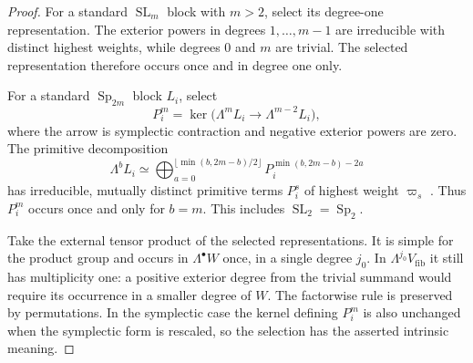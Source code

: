 \begin{proof}
For a standard $\operatorname{SL}_m$ block with $m>2$, select its
degree-one representation.  The exterior powers in degrees
$1,\ldots,m-1$ are irreducible with distinct highest weights, while
degrees $0$ and $m$ are trivial.  The selected representation therefore
occurs once and in degree one only.

For a standard $\operatorname{Sp}_{2m}$ block $L_i$, select
\[
 P_i^m=\ker\bigl(\Lambda^mL_i\longrightarrow\Lambda^{m-2}L_i\bigr),
\]
where the arrow is symplectic contraction and negative exterior powers
are zero.  The primitive decomposition
\[
 \Lambda^bL_i\simeq
 \bigoplus_{a=0}^{\lfloor\min(b,2m-b)/2\rfloor}
 P_i^{\min(b,2m-b)-2a}
\]
has irreducible, mutually distinct primitive terms $P_i^s$ of highest
weight $\varpi_s$ \cite[Theorem~17.5]{FultonHarris1991}.
Thus $P_i^m$ occurs once and only for $b=m$.  This includes
$\operatorname{SL}_2=\operatorname{Sp}_2$.

Take the external tensor product of the selected representations.
It is simple for the product group and occurs in $\Lambda^\bullet W$
once, in a single degree $j_0$.  In $\Lambda^{j_0}V_{\mathrm{fib}}$
it still has multiplicity one: a positive exterior degree from the
trivial summand would require its occurrence in a smaller degree of
$W$.  The factorwise rule is preserved by permutations.  In the
symplectic case the kernel defining $P_i^m$ is also unchanged when
the symplectic form is rescaled, so the selection has the asserted
intrinsic meaning.
\end{proof}
